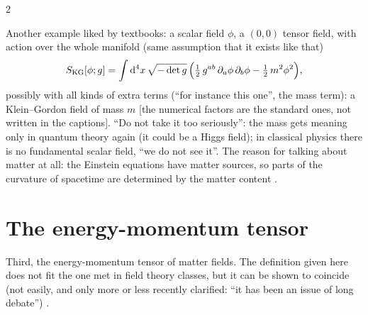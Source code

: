 \begin{paracol}{2}
\begin{example}\label{ex:c14-kg}
Another example liked by textbooks: a scalar field $\phi$, a $(0,0)$ tensor field, with action over the whole manifold (same assumption that it exists like that)
\[
  S_{\mathrm{KG}}[\phi;g]=\int\mathrm d^4x\,\sqrt{-\det g}\,\Bigl(\tfrac12\,g^{ab}\,\partial_a\phi\,\partial_b\phi-\tfrac12\,m^2\phi^2\Bigr),
\]
possibly with all kinds of extra terms (``for instance this one'', the mass term): a Klein--Gordon field of mass $m$ [the numerical factors are the standard ones, not written in the captions]. ``Do not take it too seriously'': the mass gets meaning only in quantum theory again (it could be a Higgs field); in classical physics there is no fundamental scalar field, ``we do not see it''. The reason for talking about matter at all: the Einstein equations have matter sources, so parts of the curvature of spacetime are determined by the matter content .
\end{example}

\section{The energy-momentum tensor}\label{sec:c14-emt}

Third, the energy-momentum tensor of matter fields. The definition given here does not fit the one met in field theory classes, but it can be shown to coincide (not easily, and only more or less recently clarified: ``it has been an issue of long debate'') .


\end{paracol}
